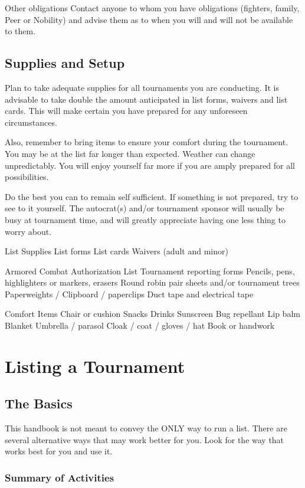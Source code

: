 \documentclass{article}
\begin{document}
Other obligations Contact anyone to whom you have obligations (fighters, family, Peer
or Nobility) and advise them as to when you will and will not be
available to them.

\subsection{Supplies and Setup}
Plan to take adequate supplies for all tournaments you are conducting. It is advisable to take double the
amount anticipated in list forms, waivers and list cards. This will make certain you have prepared for any
unforeseen circumstances.

Also, remember to bring items to ensure your comfort during the tournament. You may be at the list far
longer than expected. Weather can change unpredictably. You will enjoy yourself far more if you are
amply prepared for all possibilities.

Do the best you can to remain self sufficient. If something is not prepared, try to see to it yourself. The
autocrat(s) and/or tournament sponsor will usually be busy at tournament time, and will greatly appreciate
having one less thing to worry about.




List Supplies
List forms
List cards
Waivers (adult and minor)

Armored Combat Authorization List
Tournament reporting forms
Pencils, pens, highlighters or markers, erasers
Round robin pair sheets and/or tournament trees
Paperweights / Clipboard / paperclips
Duct tape and electrical tape


Comfort Items
Chair or cushion
Snacks
Drinks
Sunscreen
Bug repellant
Lip balm
Blanket
Umbrella / parasol
Cloak / coat / gloves / hat
Book or handwork


\section{Listing a Tournament}
\subsection{The Basics}
This handbook is not meant to convey the ONLY way to run a list. There are several alternative ways that
may work better for you. Look for the way that works best for you and use it.
\subsubsection{Summary of Activities}
\end{document}
